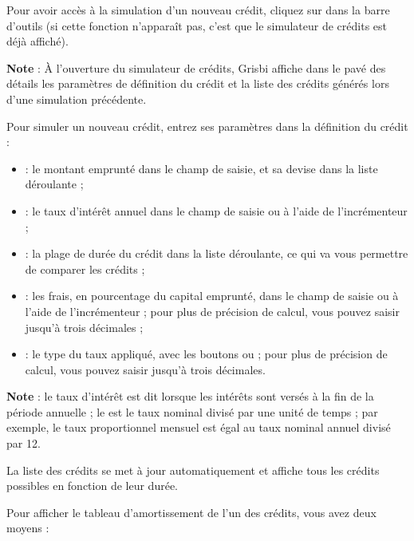 Pour avoir accès à la simulation d'un nouveau crédit, cliquez sur  dans la barre d'outils (si cette fonction n'apparaît pas, c'est que le simulateur de crédits est déjà affiché).

\textbf{Note} : À l'ouverture du simulateur de crédits, Grisbi affiche dans le pavé des détails les paramètres de définition du crédit et la liste des crédits générés lors d'une simulation précédente.

Pour simuler un nouveau crédit, entrez ses paramètres dans la définition du crédit :
\begin{itemize}
	 \item {} : le montant emprunté dans le champ de saisie, et sa devise dans la liste déroulante  ; 
	 \item {} : le taux d'intérêt annuel dans le champ de saisie ou à l'aide de l'incrémenteur ;
	 \item {} : la plage de durée du crédit dans la liste déroulante, ce qui va vous permettre de comparer les crédits ;
	 \item {} : les frais, en pourcentage du capital emprunté, dans le champ de saisie ou à l'aide de l'incrémenteur ; pour plus de précision de calcul, vous pouvez saisir jusqu'à trois décimales ;
	 \item {} : le type du taux appliqué, avec les boutons  ou   ; pour plus de précision de calcul, vous pouvez saisir jusqu'à trois décimales.
\end{itemize}

\textbf{Note} : le taux d'intérêt est dit  lorsque les intérêts sont versés à la fin de la période annuelle ; le  est le taux nominal divisé par une unité de temps ; par exemple, le taux proportionnel mensuel est égal au taux nominal annuel divisé par 12.

La liste des crédits se met à jour automatiquement et affiche tous les crédits possibles en fonction de leur durée. 

Pour afficher le tableau d'amortissement de l'un des crédits, vous avez  deux moyens :

